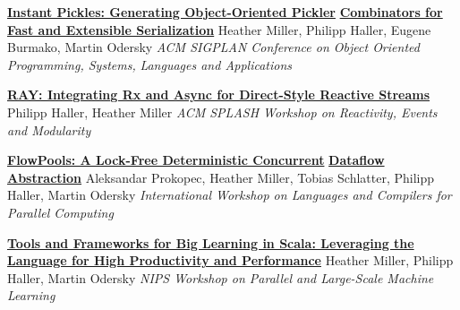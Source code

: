 \documentclass[9pt]{article}
\begin{document}
\noindent\href{http://infoscience.epfl.ch/record/188383}{\bf Instant Pickles: Generating Object-Oriented Pickler}\vspace{-0.03in}
\newline\noindent\href{http://infoscience.epfl.ch/record/188383}{\bf Combinators for Fast and Extensible Serialization}
\newline\noindent Heather Miller, Philipp Haller, Eugene Burmako, Martin Odersky
\newline\noindent\emph{ACM SIGPLAN Conference on Object Oriented Programming, Systems,}
\newline\noindent\emph{Languages and Applications}
\bigskip

\noindent\href{http://infoscience.epfl.ch/record/188383}{\bf RAY: Integrating Rx and Async for Direct-Style Reactive Streams}
\newline\noindent Philipp Haller, Heather Miller
\newline\noindent\emph{ACM SPLASH Workshop on Reactivity, Events and Modularity}
\bigskip

\pagebreak

\noindent\href{http://infoscience.epfl.ch/record/180265}{\bf FlowPools: A Lock-Free Deterministic Concurrent}\vspace{-0.03in}
\newline\noindent\href{http://infoscience.epfl.ch/record/180265}{\bf Dataflow Abstraction}
\newline\noindent Aleksandar Prokopec, Heather Miller, Tobias Schlatter,
\newline\noindent Philipp Haller, Martin Odersky
\newline\noindent\emph{International Workshop on Languages and Compilers for Parallel Computing}
\vspace{0.03in}
\newline{}
\vspace{-0.03in}
\newline{}
\vspace{-0.03in}
\newline{}
\bigskip

\noindent\href{http://infoscience.epfl.ch/record/170032}{\bf Tools and Frameworks for Big Learning in Scala: Leveraging the}\vspace{-0.03in}
\newline\noindent\href{http://infoscience.epfl.ch/record/170032}{\bf Language for High Productivity and Performance}
\newline\noindent Heather Miller, Philipp Haller, Martin Odersky
\newline\noindent\emph{NIPS Workshop on Parallel and Large-Scale Machine Learning}
\bigskip
\end{document}
